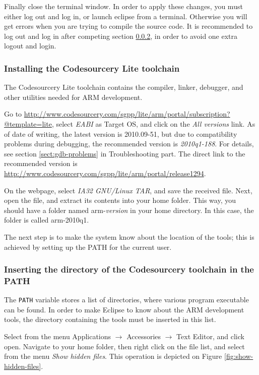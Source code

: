 \documentclass[a4paper, 10pt]{article}
\begin{document}
Finally close the terminal window.
In order to apply these changes, you must either log out and log in,
or launch eclipse from a terminal.
Otherwise you will get errors when you are trying to compile the source code.
It is recommended to log out and log in after 
competing section \ref{sect:change-path}, in order to avoid one extra logout and login.

\subsubsection{Installing the Codesourcery Lite toolchain}

The Codesourcery Lite toolchain contains 
the compiler, linker, debugger, and other utilities needed for 
ARM development.

Go to 
\url{http://www.codesourcery.com/sgpp/lite/arm/portal/subscription?@template=lite},
select \emph{EABI} as Target OS, and click on the 
\emph{All versions} link.
As of date of writing, the latest version is 2010.09-51, but
due to compatibility problems during debugging, the recommended version is \emph{2010q1-188}.
For details, see section \ref{sect:gdb-problems} in Troubleshooting part.
The direct link to the recommended version is 
\url{http://www.codesourcery.com/sgpp/lite/arm/portal/release1294}.

On the webpage, select \emph{IA32 GNU/Linux TAR},
and save the received file.
Next, open the file, and extract its contents into your home folder.
This way, you should have a folder named arm-\textit{version} in your home directory.
In this case, the folder is called arm-2010q1.

The next step is to make the system know about the location of the tools; 
this is achieved by setting up the PATH for the current user.

\subsubsection{Inserting the directory of the Codesourcery toolchain in the PATH}

    \label{sect:change-path}
The \verb+PATH+ variable stores a list of directories, where various 
program executable can be found. In order to make Eclipse to know about the 
ARM development tools, the directory containing the tools must be inserted 
in this list.
    
Select from the menu Applications $\rightarrow$ Accessories $\rightarrow$ Text Editor,
and click open. Navigate to your home folder, then right click on the file list,
and select from the menu \emph{Show hidden files}. This operation is depicted on Figure
\ref{fig:show-hidden-files}.
\end{document}
